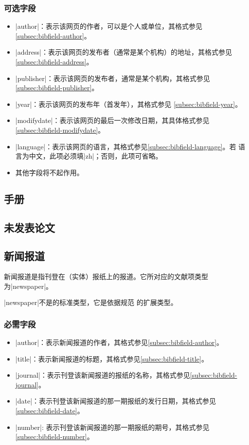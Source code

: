 \subsubsection{可选字段}

\begin{itemize}
\item |author|：表示该网页的作者，可以是个人或单位，其格式参见
  \ref{subsec:bibfield-author}。
\item |address|：表示该网页的发布者（通常是某个机构）的地址，其格式参见
  \ref{subsec:bibfield-address}。
\item |publisher|：表示该网页的发布者，通常是某个机构，其格式参见
  \ref{subsec:bibfield-publisher}。
\item |year|：表示该网页的发布年（首发年），其格式参见
  \ref{subsec:bibfield-year}。
\item |modifydate|：表示该网页的最后一次修改日期，其具体格式参见
  \ref{subsec:bibfield-modifydate}。
\item |language|：表示该网页的语言，其格式参见\ref{subsec:bibfield-language}。若
  语言为中文，此项必须填|zh|；否则，此项可省略。
\item 其他字段将不起作用。
\end{itemize}


\subsection{手册}\label{subsec:bibtype-manual}

\subsection{未发表论文}\label{subsec:bibtype-unpublished}

\subsection{新闻报道}\label{subsec:bibtype-newspaper}

新闻报道是指刊登在（实体）报纸上的报道。它所对应的{\BibTeX}文献项类型为|newspaper|。

|newspaper|不是{\BibTeX}的标准类型，它是依据规范
\cite{gbt7714-2005}的扩展类型。

\subsubsection{必需字段}

\begin{itemize}
\item |author|：表示新闻报道的作者，其格式参见\ref{subsec:bibfield-author}。
\item |title|：表示新闻报道的标题，其格式参见\ref{subsec:bibfield-title}。
\item |journal|：表示刊登该新闻报道的报纸的名称，其格式参见\ref{subsec:bibfield-journal}。
\item |date|：表示刊登该新闻报道的那一期报纸的发行日期，其格式参见\ref{subsec:bibfield-date}。
\item |number|: 表示刊登该新闻报道的那一期报纸的期号，其格式参见\ref{subsec:bibfield-number}。
\end{itemize}

